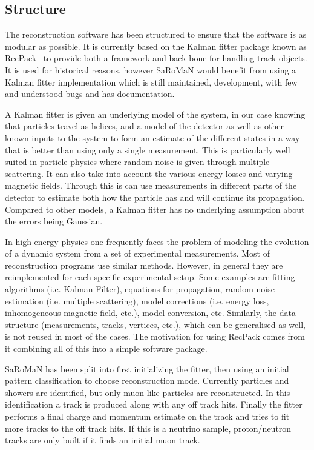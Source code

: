 \subsection{Structure}
The reconstruction software has been structured to ensure that the software is as modular as possible. It is currently based on the Kalman fitter package known as RecPack~\cite{RecPack} to provide both a framework and back bone for handling track objects. It is used for historical reasons, however SaRoMaN would benefit from using a Kalman fitter implementation which is still maintained, development, with few and understood bugs and has documentation.

A Kalman fitter is given an underlying model of the system, in our case knowing that particles travel as helices, and a model of the detector as well as other known inputs to the system to form an estimate of the different states in a way that is better than using only a single measurement. This is particularly well suited in particle physics where random noise is given through multiple scattering. It can also take into account the various energy losses and varying magnetic fields. Through this is can use measurements in different parts of the detector to estimate both how the particle has and will continue its propagation. Compared to other models, a Kalman fitter has no underlying assumption about the errors being Gaussian.

In high energy physics one frequently faces the problem of modeling the evolution of a dynamic system from a set of experimental measurements. Most of reconstruction programs use similar methods. However, in general they are reimplemented for each specific experimental setup. Some examples are fitting algorithms (i.e. Kalman Filter), equations for propagation, random noise estimation (i.e. multiple scattering), model corrections (i.e. energy loss, inhomogeneous magnetic field, etc.), model conversion, etc. Similarly, the data structure (measurements, tracks, vertices, etc.), which can be generalised as well, is not reused in most of the cases. The motivation for using RecPack comes from it combining all of this into a simple software package.

SaRoMaN has been split into first initializing the fitter, then using an initial pattern classification to choose reconstruction mode. Currently particles and showers are identified, but only muon-like particles are reconstructed. In this identification a track is produced along with any off track hits. Finally the fitter performs a final charge and momentum estimate on the track and tries to fit more tracks to the off track hits. If this is a neutrino sample, proton/neutron tracks are only built if it finds an initial muon track.

